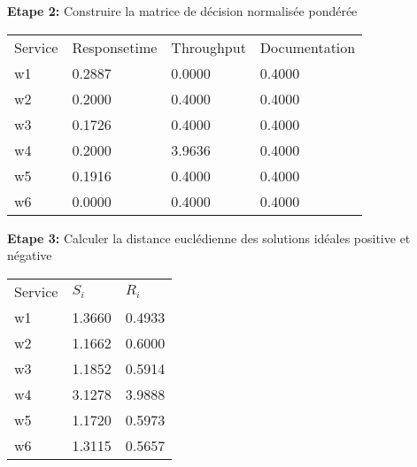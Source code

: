 \documentclass[french, 11pt, a4paper, oldfontcommands]{report}
\begin{document}
	\textbf{Etape 2:} Construire la matrice de décision normalisée pondérée
\begin{table}[ht]
	\begin{tabular}{llll}
	\rowcolor[HTML]{9B9B9B} 
	Service & Responsetime & Throughput & Documentation \\
	w1      & 0.2887       & 0.0000     & 0.4000        \\
	\rowcolor[HTML]{EFEFEF} 
	w2      & 0.2000       & 0.4000     & 0.4000        \\
	w3      & 0.1726       & 0.4000     & 0.4000        \\
	\rowcolor[HTML]{EFEFEF} 
	w4      & 0.2000       & 3.9636     & 0.4000        \\
	w5      & 0.1916       & 0.4000     & 0.4000        \\
	\rowcolor[HTML]{EFEFEF} 
	w6      & 0.0000       & 0.4000     & 0.4000       
	\end{tabular}
	\end{table}
	
	\textbf{Etape 3:} Calculer la distance euclédienne des solutions idéales positive et négative
\begin{table}[ht]
	\begin{tabular}{lll}
	\rowcolor[HTML]{9B9B9B} 
	Service & $S_i$  & $R_i$  \\
	w1      & 1.3660 & 0.4933 \\
	\rowcolor[HTML]{EFEFEF} 
	w2      & 1.1662 & 0.6000 \\
	w3      & 1.1852 & 0.5914 \\
	\rowcolor[HTML]{EFEFEF} 
	w4      & 3.1278 & 3.9888 \\
	w5      & 1.1720 & 0.5973 \\
	\rowcolor[HTML]{EFEFEF} 
	w6      & 1.3115 & 0.5657
	\end{tabular}
	\end{table}
	
\end{document}
